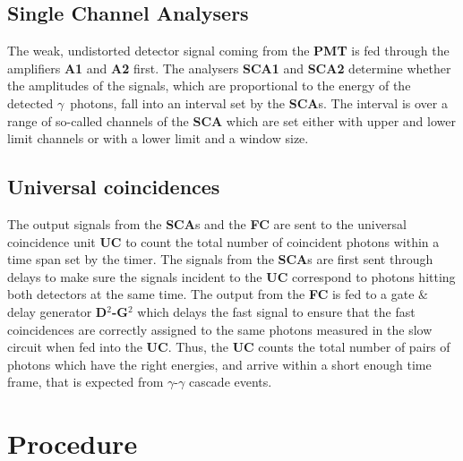 \documentclass[twocolumn]{article}
\begin{document}
\subsection{Single Channel Analysers}
The weak, undistorted detector signal coming from the \textbf{PMT} is fed through the amplifiers \textbf{A1} and \textbf{A2} first. The analysers \textbf{SCA1} and \textbf{SCA2} determine whether the amplitudes of the signals, which are proportional to the energy of the detected $\gamma$~photons, fall into an interval set by the \textbf{SCA}s. The interval is over a range of so-called channels of the \textbf{SCA} which are set either with upper and lower limit channels or with a lower limit and a window size.

\subsection{Universal coincidences}
The output signals from the \textbf{SCA}s and the \textbf{FC} are sent to the universal coincidence unit \textbf{UC} to count the total number of coincident photons within a time span set by the timer. The signals from the \textbf{SCA}s are first sent through delays to make sure the signals incident to the \textbf{UC} correspond to photons hitting both detectors at the same time. The output from the \textbf{FC} is fed to a gate $\&$ delay generator \textbf{D$^2$-G$^2$} which delays the fast signal to ensure that the fast coincidences are correctly assigned to the same photons measured in the slow circuit when fed into the \textbf{UC}. Thus, the \textbf{UC} counts the total number of pairs of photons which have the right energies, and arrive within a short enough time frame, that is expected from $\gamma$-$\gamma$ cascade events.


\section{Procedure} \label{sec:Proc}
\end{document}
